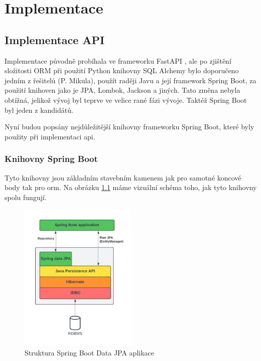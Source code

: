 \chapter{Implementace}\label{chap:implementation}

\section{Implementace API}\label{sec:impl:api}
Implementace původně probíhala ve \gls{framework}u FastAPI , ale po zjištění složitosti ORM při použití Python knihovny SQL Alchemy bylo doporučeno jedním z řešitelů (P. Mikula), použít raději Javu a její \gls{framework} Spring Boot, za použití knihoven jako je JPA, Lombok, Jackson a jiných. Tato změna nebyla obtížná, jelikož vývoj byl teprve ve velice rané fázi vývoje. Taktéž Spring Boot byl jeden z kandidátů.

Nyní budou popsány nejdůležitější knihovny \gls{framework}u Spring Boot, které byly použity při implementaci \gls{api}.


\subsection{Knihovny Spring Boot}\label{sec:impl:spring}

Tyto knihovny jsou základním stavebním kamenem jak pro samotné koncové body tak pro \gls{orm}. Na obrázku \ref{fig:JPA} máme vizuální schéma toho, jak tyto knihovny spolu fungují.

\begin{figure}[ht!]
    \centering
    \includegraphics[width=0.5\textwidth]{figures/impl/API Implementation - JPA.pdf}
    \caption{Struktura Spring Boot Data JPA aplikace}
    \label{fig:JPA}
\end{figure}

